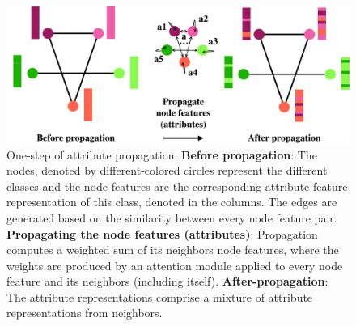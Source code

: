\documentclass[letterpaper]{article}
\begin{document}
\begin{figure}[t!]
\begin{center}
\includegraphics[width=\columnwidth]{prop-crop.pdf}
\end{center}
\caption{
One-step of attribute propagation. \textbf{Before propagation}: The nodes, denoted by different-colored circles represent the different classes and the node features are the corresponding attribute feature representation of this class, denoted in the columns. The edges are generated based on the similarity between every node feature pair. \textbf{Propagating the node features (attributes)}: Propagation computes a weighted sum of its neighbors node features, where the weights are produced by an attention module applied to every node feature and its neighbors (including itself). \textbf{After-propagation}: The attribute representations comprise a mixture of attribute representations from neighbors.
}
\label{fig:prop}
\end{figure}
\end{document}
